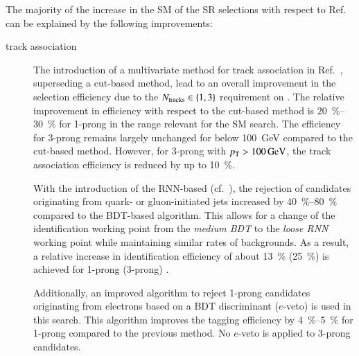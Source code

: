 The majority of the increase in the SM \HH \AccTimesEff of the SR selections
with respect to Ref.~\cite{HIGG-2016-16-witherratum} can be explained by the
following improvements:
\begin{description}

\item[\tauhadvis track association] The introduction of a multivariate method
  for \tauhadvis track association in Ref.~\cite{duschinger}, superseding a
  cut-based method, lead to an overall improvement in the \tauhadvis selection
  efficiency due to the $N_{\text{tracks}} \in \{1, 3\}$ requirement on \tauhadvis. The
  relative improvement in efficiency with respect to the cut-based method is
  \SIrange{20}{30}{\percent} for 1-prong \tauhadvis in the \tauhadvis \pT range
  relevant for the SM \HH search.
  The efficiency for 3-prong \tauhadvis remains largely unchanged for \tauhadvis
  \pT below \SI{100}{\GeV} compared to the cut-based method. However, for
  3-prong \tauhadvis with $\pT > \SI{100}{\GeV}$, the track association
  efficiency is reduced by up to \SI{10}{\percent}.

\item[\Tauid] With the introduction of the RNN-based \tauid
  (cf.~), the rejection of \tauhadvis candidates originating
  from quark- or gluon-initiated jets increased by \SIrange{40}{80}{\percent}
  compared to the BDT-based algorithm. This allows for a change of the
  identification working point from the \emph{medium BDT} to the \emph{loose
    RNN} working point while maintaining similar rates of \faketauhadvis
  backgrounds. As a result, a relative increase in \tauhadvis identification
  efficiency of about \SI{13}{\percent} (\SI{25}{\percent}) is achieved for
  1-prong (3-prong) \tauhadvis.

  Additionally, an improved algorithm to reject 1-prong \tauhadvis candidates
  originating from electrons based on a BDT discriminant ($e$-veto) is used
  in this search. This algorithm improves the tagging efficiency by
  \SIrange{4}{5}{\percent} for 1-prong \tauhadvis compared to the previous
  method. No $e$-veto is applied to 3-prong \tauhadvis candidates.



\end{description}

